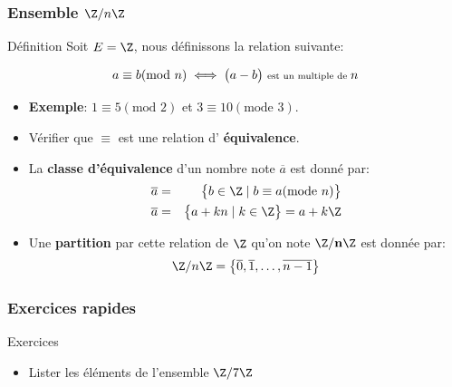 \documentclass[usenames,dvipsnames]{beamer}
\begin{document}
\begin{frame}[<+->]
  \frametitle{Ensemble $\Z/n\Z$}
  
  \begin{block}{Définition}
    Soit $ E = \Z$, nous définissons la relation suivante:

    \begin{equation}
      a \equiv b (\text{mod } n) \iff  \big(a - b\big) \text{ \scriptsize est un multiple de } n
    \end{equation}
  \end{block}
  \begin{itemize}
    \small
  \item \textbf{Exemple}: $1\equiv 5 (\text{mod } 2)$ et $3\equiv 10 (\text{mode
    } 3)$.
    \item Vérifier que $\equiv$ est une relation d'
      \textbf{\alert{équivalence}}.
    \item La \textbf{classe d'équivalence} d'un nombre note $\overline{a}$ est
      donné par:
      \begin{eqnarray*}
        \overline{a} &=&\big\{ b\in \Z\;|\; b \equiv a (\text{mode } n)\big\} \\
        \overline{a} &=& \big\{ a + kn \;|\; k\in \Z\big\}  = a + k\Z
      \end{eqnarray*}
    \item Une \textbf{partition} par cette relation  de $\Z$ qu'on note
      \alert{$\mathbf{\Z/n\Z}$}  est donnée par:
      \begin{equation*}
        \Z/n\Z = \big\{ \overline{0}, \overline{1},\ldots, \overline{n-1}\big\} 
      \end{equation*}
  \end{itemize}
\end{frame}
\begin{frame}[t]
  \frametitle{Exercices rapides}

  \begin{block}{Exercices}
    \begin{itemize}
      \item Lister les éléments de l'ensemble $\Z/7\Z$
    \end{itemize}
  \end{block}
  
\end{frame}
\end{document}
